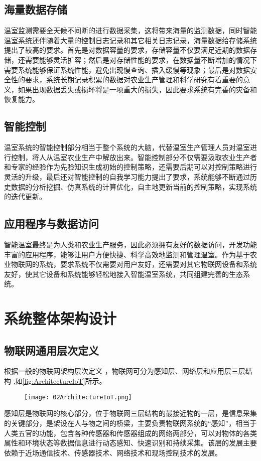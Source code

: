 	\subsection{海量数据存储}
温室监测需要全天候不间断的进行数据采集，这将带来海量的监测数据，同时智能温室系统还伴随着大量的控制日志记录和其它相关日志记录，海量数据给存储系统提出了较高的要求\supercite{SunHongying2010}。首先是对数据容量的要求，存储容量不仅要满足近期的数据存储，还需要能够灵活扩容；然后是对存储性能的要求，在数据量不断增加的情况下需要系统能够保证系统性能，避免出现慢查询、插入缓慢等现象；最后是对数据安全性的要求，系统长期记录积累的数据对农业生产管理和科学研究有着重要的意义，如果出现数据丢失或损坏将是一项重大的损失，因此要求系统有完善的灾备和恢复能力。
	\subsection{智能控制}
温室系统的智能控制部分相当于整个系统的大脑，代替温室生产管理人员对温室进行控制，将人从温室农业生产中解放出来。智能控制部分不仅需要汲取农业生产者和专家的经验作为先验知识生成初始的控制策略，还需要后期可以对控制策略进行灵活的升级，最后还对智能控制的自我学习能力提出了要求，系统能够不断通过历史数据的分析挖掘、仿真系统的计算优化，自主地更新当前的控制策略，实现系统的迭代更新。
	\subsection{应用程序与数据访问}
智能温室最终是为人类和农业生产服务，因此必须拥有友好的数据访问，开发功能丰富的应用程序，能够让用户方便快捷、科学高效地监测和管理温室。作为基于农业物联网的系统，要求系统不仅需要对用户友好，还需要对其它物联网设备和系统友好，使其它设备和系统能够轻松地接入智能温室系统，共同组建完善的生态系统。


\section{系统整体架构设计}
	\subsection{物联网通用层次定义}
	根据一般的物联网架构层次定义\supercite{Yu2011,LiuQiang2010} ，物联网可分为感知层、网络层和应用层三层结构\supercite{HanYi2016A,WangHuaiyu2015} ,如\ref{fig:ArchitectureIoT}所示。
	\begin{figure}[!htbp]
  		\centering
 		\texttt{[image: 02ArchitectureIoT.png]}
	\end{figure}
	感知层是物联网的核心部分，位于物联网三层结构的最接近物的一层，是信息采集的关键部分，是架设在人与物之间的桥梁，主要负责物联网系统的“感知”，相当于人类五官的功能，包含各种传感器和传感器组成的网络两部分，可以对物体的各类属性和环境状态等数据信息进行动态感知、快速识别和持续采集。该层的发展主要依赖于近场通信技术、传感器技术、网络技术和现场控制技术的发展。
	
